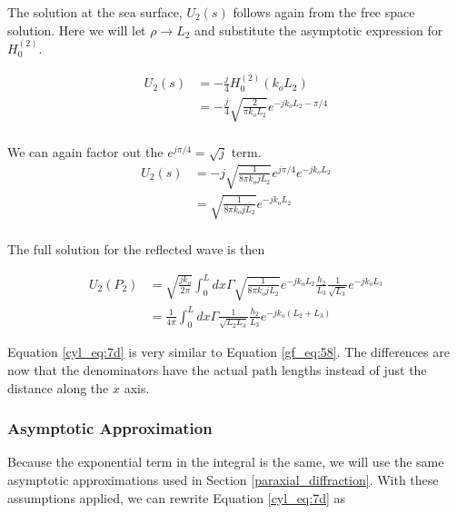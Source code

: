 \noindent The solution at the sea surface, $U_2(s)$ follows again from the free space solution. Here we will let $\rho \rightarrow L_2$ and substitute the asymptotic expression for $H_0^{(2)}$.

 \begin{equation}
\begin{aligned}
U_2(s) &= -\frac{j}{4}H_0^{(2)}(k_o L_2) \\
&= -\frac{j}{4}\sqrt{\frac{2}{\pi k_o L_2}}e^{-jk_oL_2 -\pi/4}\\
\label{cyl_eq:7c}
\end{aligned}
\end{equation}
\renewcommand{\baselinestretch}{2} \small\normalsize

\noindent We can again factor out the $e^{j\pi/4} = \sqrt{j}$ term.
 \begin{equation}
\begin{aligned}
U_2(s) &= -j\sqrt{\frac{1}{8\pi k_oj L_2}}e^{j\pi/4}e^{-jk_oL_2} \\
&= \sqrt{\frac{1}{8 \pi k_o j L_2}}e^{-jk_oL_2} \\
\label{cyl_eq:7ca}
\end{aligned}
\end{equation}
\renewcommand{\baselinestretch}{2} \small\normalsize

\noindent The full solution for the reflected wave is then

\begin{equation}
\begin{aligned}
U_2(P_2) &= \sqrt{\frac{j k_o}{2\pi}}\int_0^L dx \Gamma \sqrt{\frac{1}{8 \pi k_o j L_2}}e^{-jk_oL_2}  \frac{h_2}{L_3}\frac{1}{\sqrt{L_3}}e^{-jk_oL_3} \\
&= \frac{1}{4\pi} \int_0^L dx \Gamma \frac{1}{\sqrt{L_2L_3}}\frac{h_2}{L_3} e^{-jk_o(L_2+L_3)}
\label{cyl_eq:7d}
\end{aligned}
\end{equation}
\renewcommand{\baselinestretch}{2} \small\normalsize

Equation \ref{cyl_eq:7d} is very similar to Equation \ref{gf_eq:58}. The differences are now that the denominators have the actual path lengths instead of just the distance along the $x$ axis.

\subsubsection{Asymptotic Approximation}
Because the exponential term in the integral is the same, we will use the same asymptotic approximations used in Section \ref{paraxial_diffraction}. With these assumptions applied, we can rewrite Equation \ref{cyl_eq:7d} as

